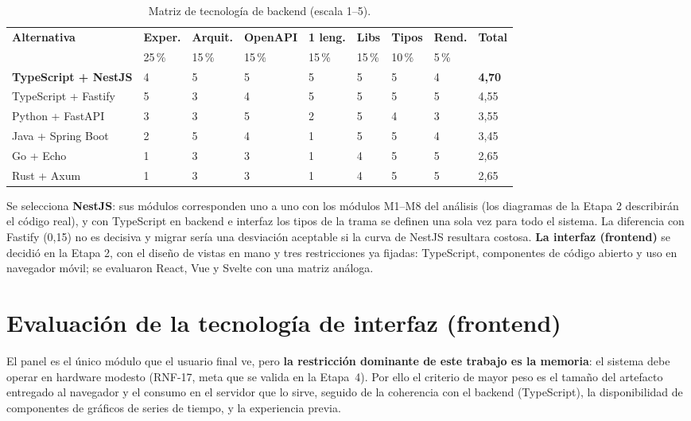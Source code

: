 \begin{table}[H]
\centering\footnotesize
\begin{tablaseg}
\begin{tabular}{@{}L{3.6cm}C{1.3cm}C{1.4cm}C{1.4cm}C{1.4cm}C{1.1cm}C{1.1cm}C{1.1cm}C{1.1cm}@{}}
\toprule
\textbf{Alternativa} & \textbf{Exper.} & \textbf{Arquit.} & \textbf{OpenAPI} & \textbf{1 leng.} & \textbf{Libs} & \textbf{Tipos} & \textbf{Rend.} & \textbf{Total} \\
 & 25\,\% & 15\,\% & 15\,\% & 15\,\% & 15\,\% & 10\,\% & 5\,\% & \\
\midrule
\textbf{TypeScript + NestJS} & 4 & 5 & 5 & 5 & 5 & 5 & 4 & \textbf{4,70} \\
TypeScript + Fastify & 5 & 3 & 4 & 5 & 5 & 5 & 5 & 4,55 \\
Python + FastAPI & 3 & 3 & 5 & 2 & 5 & 4 & 3 & 3,55 \\
Java + Spring Boot & 2 & 5 & 4 & 1 & 5 & 5 & 4 & 3,45 \\
Go + Echo & 1 & 3 & 3 & 1 & 4 & 5 & 5 & 2,65 \\
Rust + Axum & 1 & 3 & 3 & 1 & 4 & 5 & 5 & 2,65 \\
\bottomrule
\end{tabular}
\end{tablaseg}
\caption{Matriz de tecnología de backend (escala 1--5).}
\label{tab:backend}
\end{table}

Se selecciona \textbf{NestJS}: sus módulos corresponden uno a uno con los módulos M1--M8 del
análisis (los diagramas de la Etapa 2 describirán el código real), y con TypeScript en backend e
interfaz los tipos de la trama se definen una sola vez para todo el sistema. La diferencia con
Fastify (0,15) no es decisiva y migrar sería una desviación aceptable si la curva de NestJS
resultara costosa. \textbf{La interfaz (frontend)} se decidió en la Etapa 2, con el diseño de vistas
en mano y tres restricciones ya fijadas: TypeScript, componentes de código abierto y uso en
navegador móvil; se evaluaron React, Vue y Svelte con una matriz análoga.

\section{Evaluación de la tecnología de interfaz (frontend)}

El panel es el único módulo que el usuario final ve, pero \textbf{la restricción dominante de este
trabajo es la memoria}: el sistema debe operar en hardware modesto (RNF-17, meta que se valida en la
Etapa~4). Por ello el
criterio de mayor peso es el tamaño del artefacto entregado al navegador y el consumo en el
servidor que lo sirve, seguido de la coherencia con el backend (TypeScript), la disponibilidad de
componentes de gráficos de series de tiempo, y la experiencia previa.

